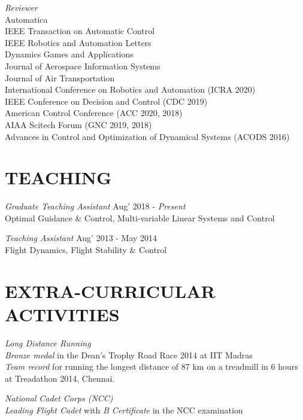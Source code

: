 \documentclass[margin, 10pt]{res} %
\begin{document}
\begin{resume}
{\sl Reviewer}\\
Automatica\\
IEEE Transaction on Automatic Control\\
IEEE Robotics and Automation Letters\\
Dynamics Games and Applications\\
Journal of Aerospace Information Systems\\
Journal of Air Transportation\\
International Conference on Robotics and Automation (ICRA 2020)\\
IEEE Conference on Decision and Control (CDC 2019)\\
American Control Conference (ACC 2020, 2018)\\
AIAA Scitech Forum (GNC 2019, 2018)\\
Advances in Control and Optimization of Dynamical Systems (ACODS 2016)


\section{TEACHING}

{\sl Graduate Teaching Assistant} \hfill Aug' 2018 - \emph{Present} \\
Optimal Guidance \& Control, Multi-variable Linear Systems and Control

{\sl Teaching Assistant} \hfill Aug' 2013 - May 2014 \\
Flight Dynamics, Flight Stability \& Control


\section{EXTRA-CURRICULAR ACTIVITIES} 

{\sl Long Distance Running}\\
\emph{Bronze medal} in the Dean’s Trophy Road Race 2014 at IIT Madras \\ 
\emph{Team record} for running the longest distance of 87 km on a treadmill in 6 hours at Treadathon 2014,
Chennai.

{\sl National Cadet Corps (NCC)}\\
\emph{Leading Flight Cadet} with \emph{B Certificate} in the NCC examination


\end{resume}
\end{document}
